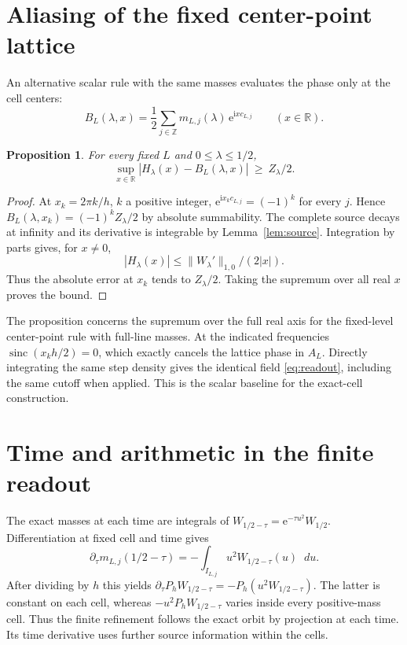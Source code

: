 \documentclass[11pt]{article}
\newtheorem{proposition}[theorem]{Proposition}
\DeclareMathOperator{\sinc}{sinc}
\newcommand{\R}{\mathbb R}
\newcommand{\dd}{\mathop{}\!d}
\newcommand{\ee}{\mathrm e}
\newcommand{\ii}{\mathrm i}
\newcommand{\norm}[1]{\lVert#1\rVert}
\begin{document}
\section{Aliasing of the fixed center-point lattice}\label{sec:alias}

An alternative scalar rule with the same masses evaluates the
phase only at the cell centers:
\[
 B_L(\lambda,x)=\frac12\sum_{j\in\mathbb Z}
                 m_{L,j}(\lambda)\,\ee^{\ii x c_{L,j}}
 \qquad (x\in\R).
\]

\begin{proposition}\label{prop:aliasing}
For every fixed \(L\) and \(0\le\lambda\le1/2\),
\[
 \sup_{x\in\R}|H_\lambda(x)-B_L(\lambda,x)|\ \ge\ Z_\lambda/2 .
\]
\end{proposition}

\begin{proof}
At \(x_k=2\pi k/h\), \(k\) a positive integer,
\(\ee^{\ii x_k c_{L,j}}=(-1)^k\) for every \(j\).
Hence \(B_L(\lambda,x_k)=(-1)^k Z_\lambda/2\) by absolute
summability. The complete source decays at infinity and its
derivative is integrable by Lemma~\ref{lem:source}. Integration
by parts gives, for \(x\ne0\),
\[
  |H_\lambda(x)|\le \norm{W_\lambda'}_{1,0}/(2|x|).
\]
Thus the absolute error at \(x_k\) tends to
\(Z_\lambda/2\). Taking the supremum over all real \(x\) proves
the bound.
\end{proof}

The proposition concerns the supremum over the full real axis
for the fixed-level center-point rule with full-line masses.
At the indicated frequencies \(\sinc(x_kh/2)=0\), which exactly
cancels the lattice phase in \(A_L\). Directly integrating the
same step density gives the identical field \eqref{eq:readout},
including the same cutoff when applied. This is the scalar
baseline for the exact-cell construction.

\section{Time and arithmetic in the finite readout}\label{sec:time}

The exact masses at each time are integrals of
\(W_{1/2-\tau}=\ee^{-\tau u^2} W_{1/2}\). Differentiation at fixed
cell and time gives
\[
 \partial_\tau m_{L,j}(1/2-\tau)
    =-\int_{I_{L,j}}u^2 W_{1/2-\tau}(u)\dd u .
\]
After dividing by \(h\) this yields
\(\partial_\tau P_h W_{1/2-\tau}=-P_h(u^2 W_{1/2-\tau})\).
The latter is constant on each cell, whereas
\(-u^2 P_h W_{1/2-\tau}\) varies inside every positive-mass cell.
Thus the finite refinement follows the exact orbit by projection
at each time. Its time derivative uses further source information
within the cells.
\end{document}
